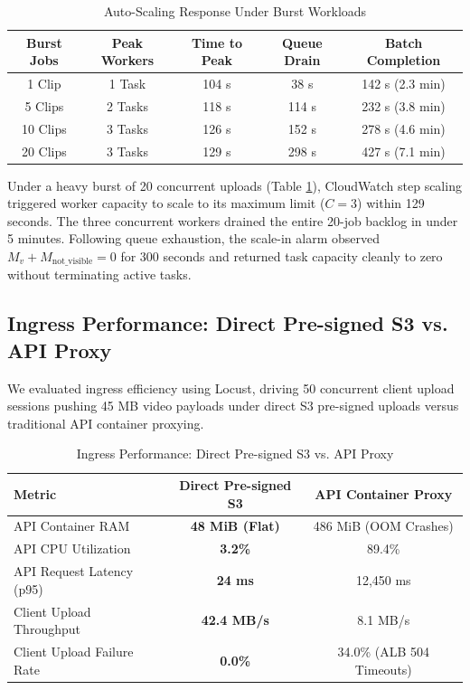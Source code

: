 \documentclass[conference]{IEEEtran}
\begin{document}
\begin{table}[htbp]
\caption{Auto-Scaling Response Under Burst Workloads}
\label{tab:scaling}
\begin{center}
\begin{tabular}{ccccc}
\toprule
\textbf{Burst Jobs} & \textbf{Peak Workers} & \textbf{Time to Peak} & \textbf{Queue Drain} & \textbf{Batch Completion} \\
\midrule
1 Clip & 1 Task & 104 s & 38 s & 142 s (2.3 min) \\
5 Clips & 2 Tasks & 118 s & 114 s & 232 s (3.8 min) \\
10 Clips & 3 Tasks & 126 s & 152 s & 278 s (4.6 min) \\
20 Clips & 3 Tasks & 129 s & 298 s & 427 s (7.1 min) \\
\bottomrule
\end{tabular}
\end{center}
\end{table}

Under a heavy burst of 20 concurrent uploads (Table \ref{tab:scaling}), CloudWatch step scaling triggered worker capacity to scale to its maximum limit ($C = 3$) within 129 seconds. The three concurrent workers drained the entire 20-job backlog in under 5 minutes. Following queue exhaustion, the scale-in alarm observed $M_v + M_{\text{not\_visible}} = 0$ for 300 seconds and returned task capacity cleanly to zero without terminating active tasks.

\subsection{Ingress Performance: Direct Pre-signed S3 vs. API Proxy}
We evaluated ingress efficiency using Locust, driving 50 concurrent client upload sessions pushing 45 MB video payloads under direct S3 pre-signed uploads versus traditional API container proxying.

\begin{table}[htbp]
\caption{Ingress Performance: Direct Pre-signed S3 vs. API Proxy}
\label{tab:ingress}
\begin{center}
\begin{tabular}{lcc}
\toprule
\textbf{Metric} & \textbf{Direct Pre-signed S3} & \textbf{API Container Proxy} \\
\midrule
API Container RAM & \textbf{48 MiB (Flat)} & 486 MiB (OOM Crashes) \\
API CPU Utilization & \textbf{3.2\%} & 89.4\% \\
API Request Latency (p95) & \textbf{24 ms} & 12,450 ms \\
Client Upload Throughput & \textbf{42.4 MB/s} & 8.1 MB/s \\
Client Upload Failure Rate & \textbf{0.0\%} & 34.0\% (ALB 504 Timeouts) \\
\bottomrule
\end{tabular}
\end{center}
\end{table}
\end{document}

